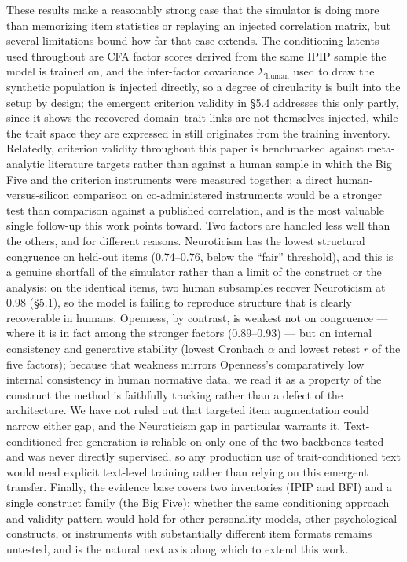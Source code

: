 \documentclass[11pt]{article}
\begin{document}
These results make a reasonably strong case that the simulator is doing more than memorizing item statistics or replaying an injected correlation matrix, but several limitations bound how far that case extends. The conditioning latents used throughout are CFA factor scores derived from the same IPIP sample the model is trained on, and the inter-factor covariance $\Sigma_{\text{human}}$ used to draw the synthetic population is injected directly, so a degree of circularity is built into the setup by design; the emergent criterion validity in \S{}5.4 addresses this only partly, since it shows the recovered domain–trait links are not themselves injected, while the trait space they are expressed in still originates from the training inventory. Relatedly, criterion validity throughout this paper is benchmarked against meta-analytic literature targets rather than against a human sample in which the Big Five and the criterion instruments were measured together; a direct human-versus-silicon comparison on co-administered instruments would be a stronger test than comparison against a published correlation, and is the most valuable single follow-up this work points toward. Two factors are handled less well than the others, and for different reasons. Neuroticism has the lowest structural congruence on held-out items (0.74--0.76, below the ``fair'' threshold), and this is a genuine shortfall of the simulator rather than a limit of the construct or the analysis: on the identical items, two human subsamples recover Neuroticism at 0.98 (\S{}5.1), so the model is failing to reproduce structure that is clearly recoverable in humans. Openness, by contrast, is weakest not on congruence --- where it is in fact among the stronger factors (0.89--0.93) --- but on internal consistency and generative stability (lowest Cronbach $\alpha$ and lowest retest $r$ of the five factors); because that weakness mirrors Openness's comparatively low internal consistency in human normative data, we read it as a property of the construct the method is faithfully tracking rather than a defect of the architecture. We have not ruled out that targeted item augmentation could narrow either gap, and the Neuroticism gap in particular warrants it. Text-conditioned free generation is reliable on only one of the two backbones tested and was never directly supervised, so any production use of trait-conditioned text would need explicit text-level training rather than relying on this emergent transfer. Finally, the evidence base covers two inventories (IPIP and BFI) and a single construct family (the Big Five); whether the same conditioning approach and validity pattern would hold for other personality models, other psychological constructs, or instruments with substantially different item formats remains untested, and is the natural next axis along which to extend this work.
\end{document}
